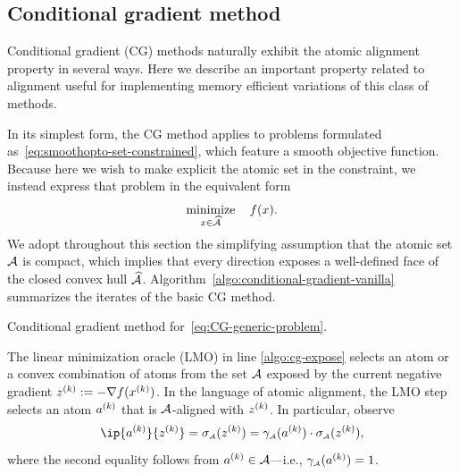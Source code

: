 \subsection{Conditional gradient method}

Conditional gradient (CG) methods
\cite{jaggi2013revisiting,frank1956algorithm,dunn1978conditional} naturally
exhibit the atomic alignment property in several ways. Here we describe an
important property related to alignment useful for implementing memory
efficient variations of this class of methods.

In its simplest form, the CG method applies to problems formulated
as~\eqref{eq:smoothopto-set-constrained}, which feature a smooth objective
function. Because here we wish to make explicit the atomic set in the
constraint, we instead express that problem in the equivalent form 
\begin{equation} \label{eq:CG-generic-problem}
   \displaystyle\mathop{\hbox{\rm minimize}}_{x\in\widehat{\mathcal{A}}}\enspace\enspace f(x).
\end{equation}
We adopt throughout this section the simplifying assumption that the atomic set
$\mathcal{A}$ is compact, which implies that every direction exposes a well-defined
face of the closed convex hull $\widehat{\mathcal{A}}$.
Algorithm~\ref{algo:conditional-gradient-vanilla} summarizes the iterates of the basic CG
method. 

\begin{algorithm}[t]
  \DontPrintSemicolon\setcounter{AlgoLine}{-1}
  \caption{Conditional gradient method for~\eqref{eq:CG-generic-problem}.\label{algo:conditional-gradient-vanilla}}
\end{algorithm}

The linear minimization oracle (LMO) in line \ref{algo:cg-expose} selects an atom or
a convex combination of atoms from the set $\mathcal{A}$ exposed by the current
negative gradient $z^{(k)}:=-\nabla f(x^{(k)})$. In the language of atomic alignment,
the LMO step selects an atom $a^{(k)}$ that is $\mathcal{A}$-aligned with $z^{(k)}$. In
particular, observe
\[
  \ip{a\k}{z\k} = \sigma\As(z\k) = \gauge\As(a\k)\cdot\sigma\As(z\k),
\]
where the second equality follows from $a^{(k)}\in\mathcal{A}$---i.e., $\gamma_{\scriptscriptstyle\mathcal{A}}(a^{(k)})=1$.

